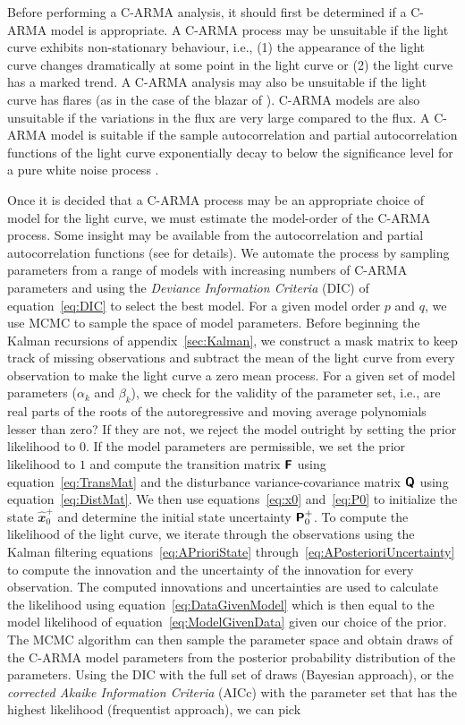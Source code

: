 \documentclass[a4paper,fleqn,usenatbib]{mnras}
\begin{document}
Before performing a C-ARMA analysis, it should first be determined if a C-ARMA model is appropriate. A C-ARMA process may be unsuitable if the light curve exhibits non-stationary behaviour, i.e., (1) the appearance of the light curve changes dramatically at some point in the light curve or (2) the light curve has a marked trend. A C-ARMA analysis may also be unsuitable if the light curve has flares (as in the case of the blazar of \citealp{Edelson13}). C-ARMA models are also unsuitable if the variations in the flux are very large compared to the flux. A C-ARMA model is suitable if the sample autocorrelation and partial autocorrelation functions of the light curve exponentially decay to below the significance level for a pure white noise process \citep{BrockwellDavisITSF}. 

Once it is decided that a C-ARMA process may be an appropriate choice of model for the light curve, we must estimate the model-order of the C-ARMA process. Some insight may be available from the autocorrelation and partial autocorrelation functions (see \citealp{BrockwellDavisITSF} for details). We automate the process by sampling parameters from a range of models with increasing numbers of C-ARMA parameters and using the \textit{Deviance Information Criteria} (DIC) of equation~\eqref{eq:DIC} to select the best model. For a given model order $p$ and $q$, we use MCMC to sample the space of model parameters. Before beginning the Kalman recursions of appendix~\ref{sec:Kalman}, we construct a mask matrix to keep track of missing observations and subtract the mean of the light curve from every observation to make the light curve a zero mean process. For a given set of model parameters ($\alpha_{k}$ and $\beta_{k}$), we check for the validity of the parameter set, i.e., are real parts of the roots of the autoregressive and moving average polynomials lesser than zero? If they are not, we reject the model outright by setting the prior likelihood to $0$. If the model parameters are permissible, we set the prior likelihood to $1$ and compute the transition matrix $\textbf{\textsf{F}}$ using equation~\eqref{eq:TransMat} and the disturbance variance-covariance matrix $\textbf{\textsf{Q}}$ using equation~\eqref{eq:DistMat}. We then use equations~\eqref{eq:x0} and~\eqref{eq:P0} to initialize the state $\widehat{\mathbfit{x}}^{+}_{0}$ and determine the initial state uncertainty $\textbf{\textsf{P}}^{+}_{0}$. To compute the likelihood of the light curve, we iterate through the observations using the Kalman filtering equations~\eqref{eq:APrioriState} through~\eqref{eq:APosterioriUncertainty} to compute the innovation and the uncertainty of the innovation for every observation. The computed innovations and uncertainties are used to calculate the likelihood using equation~\eqref{eq:DataGivenModel} which is then equal to the model likelihood of equation~\eqref{eq:ModelGivenData} given our choice of the prior. The MCMC algorithm can then sample the parameter space and obtain draws of the C-ARMA model parameters from the posterior probability distribution of the parameters. Using the DIC with the full set of draws (Bayesian approach), or the \textit{corrected Akaike Information Criteria} (AICc) with the parameter set that has the highest likelihood (frequentist approach), we can pick 
\end{document}
